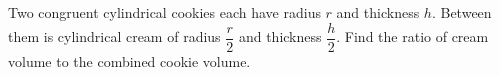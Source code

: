 Two congruent cylindrical cookies each have radius $r$ and thickness $h$. Between them is cylindrical cream of radius $\dfrac{r}{2}$ and thickness $\dfrac{h}{2}$. Find the ratio of cream volume to the combined cookie volume.
